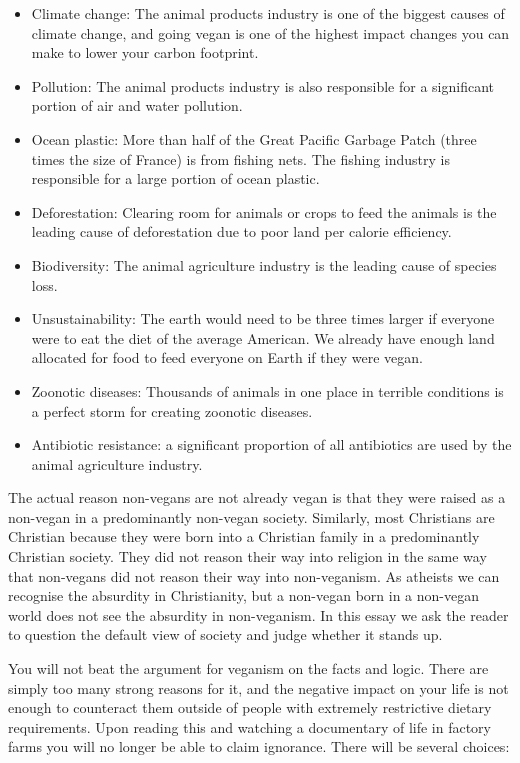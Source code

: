 \begin{itemize}
	\item Climate change: The animal products industry is one of the biggest causes of climate change, and going vegan is one of the highest impact changes you can make to lower your carbon footprint.
	\item Pollution: The animal products industry is also responsible for a significant portion of air and water pollution.
	\item Ocean plastic: More than half of the Great Pacific Garbage Patch (three times the size of France) is from fishing nets. The fishing industry is responsible for a large portion of ocean plastic.
	\item Deforestation: Clearing room for animals or crops to feed the animals is the leading cause of deforestation due to poor land per calorie efficiency.
	\item Biodiversity: The animal agriculture industry is the leading cause of species loss.
	\item Unsustainability: The earth would need to be three times larger if everyone were to eat the diet of the average American. We already have enough land allocated for food to feed everyone on Earth if they were vegan.
	\item Zoonotic diseases: Thousands of animals in one place in terrible conditions is a perfect storm for creating zoonotic diseases.
	\item Antibiotic resistance: a significant proportion of all antibiotics are used by the animal agriculture industry.
\end{itemize}

The actual reason non-vegans are not already vegan is that they were raised as a non-vegan in a predominantly non-vegan society. Similarly, most Christians are Christian because they were born into a Christian family in a predominantly Christian society. They did not reason their way into religion in the same way that non-vegans did not reason their way into non-veganism. As atheists we can recognise the absurdity in Christianity, but a non-vegan born in a non-vegan world does not see the absurdity in non-veganism. In this essay we ask the reader to question the default view of society and judge whether it stands up.

You will not beat the argument for veganism on the facts and logic. There are simply too many strong reasons for it, and the negative impact on your life is not enough to counteract them outside of people with extremely restrictive dietary requirements. Upon reading this and watching a documentary of life in factory farms you will no longer be able to claim ignorance. There will be several choices:


